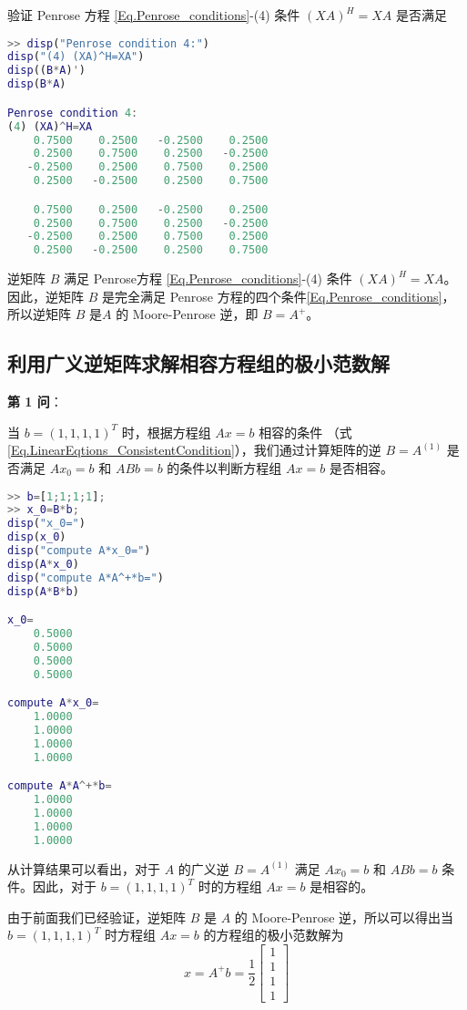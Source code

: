 验证 Penrose 方程 \ref{Eq.Penrose_conditions}-(4) 条件 $(XA)^H = XA$ 是否满足
\begin{lstlisting}[language=Matlab]
>> disp("Penrose condition 4:")
disp("(4) (XA)^H=XA")
disp((B*A)')
disp(B*A)

Penrose condition 4:
(4) (XA)^H=XA
    0.7500    0.2500   -0.2500    0.2500
    0.2500    0.7500    0.2500   -0.2500
   -0.2500    0.2500    0.7500    0.2500
    0.2500   -0.2500    0.2500    0.7500

    0.7500    0.2500   -0.2500    0.2500
    0.2500    0.7500    0.2500   -0.2500
   -0.2500    0.2500    0.7500    0.2500
    0.2500   -0.2500    0.2500    0.7500
\end{lstlisting}
逆矩阵 $B$ 满足 Penrose方程 \ref{Eq.Penrose_conditions}-(4) 条件 $(XA)^H = XA$。因此，逆矩阵 $B$ 是完全满足 Penrose 方程的四个条件\ref{Eq.Penrose_conditions}，所以逆矩阵 $B$ 是$A$ 的 Moore-Penrose 逆，即 $B=A^+$。

\subsection{利用广义逆矩阵求解相容方程组的极小范数解}
\textbf{第 1 问}：

当 $b=(1,1,1,1)^T$ 时，根据方程组 $Ax=b$ 相容的条件 （式\ref{Eq.LinearEqtions_ConsistentCondition}），我们通过计算矩阵的逆 $B=A^{(1)}$ 是否满足 $Ax_0=b$ 和 $ABb=b$ 的条件以判断方程组 $Ax=b$ 是否相容。

\begin{lstlisting}[language=Matlab]  
>> b=[1;1;1;1];
>> x_0=B*b;
disp("x_0=")
disp(x_0)
disp("compute A*x_0=")
disp(A*x_0)
disp("compute A*A^+*b=")
disp(A*B*b)

x_0=
    0.5000
    0.5000
    0.5000
    0.5000

compute A*x_0=
    1.0000
    1.0000
    1.0000
    1.0000

compute A*A^+*b=
    1.0000
    1.0000
    1.0000
    1.0000
\end{lstlisting}

从计算结果可以看出，对于 $A$ 的广义逆 $B=A^{(1)}$ 满足 $Ax_0=b$ 和 $ABb=b$ 条件。因此，对于 $b=(1,1,1,1)^T$ 时的方程组 $Ax=b$ 是相容的。

由于前面我们已经验证，逆矩阵 $B$ 是 $A$ 的 Moore-Penrose 逆，所以可以得出当 $b=(1,1,1,1)^T$ 时方程组 $Ax=b$ 的方程组的极小范数解为 
\begin{equation}
    x = A^+b = \frac{1}{2}
    \begin{bmatrix}
        1 \\ 1 \\ 1 \\ 1
    \end{bmatrix}
\end{equation}


